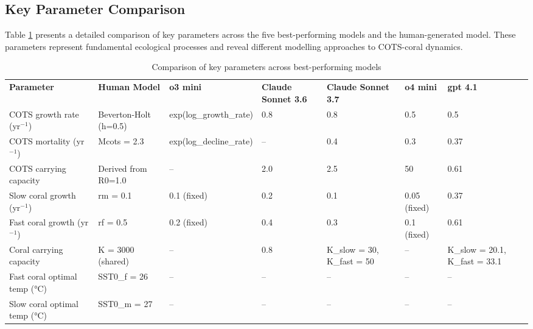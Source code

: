 
\subsection{Key Parameter Comparison}
\label{subsec:parameter_comparison}

Table \ref{tab:parameter_comparison} presents a detailed comparison of key parameters across the five best-performing models and the human-generated model. These parameters represent fundamental ecological processes and reveal different modelling approaches to COTS-coral dynamics.

\begin{landscape}
\begin{table}[H]
\centering
\begin{footnotesize}
\caption{Comparison of key parameters across best-performing models}
\label{tab:parameter_comparison}
\begin{tabular}{p{3.2cm}p{2.8cm}p{2.8cm}p{2.8cm}p{2.8cm}p{2.8cm}p{2.8cm}}
 
\textbf{Parameter} & \textbf{Human Model} & \textbf{o3 mini} & \textbf{Claude Sonnet 3.6} & \textbf{Claude Sonnet 3.7} & \textbf{o4 mini} & \textbf{gpt 4.1} \\
 
COTS growth rate (yr$^{-1}$) & Beverton-Holt (h=0.5) & exp(log\_growth\_rate) & 0.8 & 0.8 & 0.5 & 0.5 \\
 
COTS mortality (yr$^{-1}$) & Mcots = 2.3 & exp(log\_decline\_rate) & -- & 0.4 & 0.3 & 0.37 \\
 
COTS carrying capacity & Derived from R0=1.0 & -- & 2.0 & 2.5 & 50 & 0.61 \\
 
Slow coral growth (yr$^{-1}$) & rm = 0.1 & 0.1 (fixed) & 0.2 & 0.1 & 0.05 (fixed) & 0.37 \\
 
Fast coral growth (yr$^{-1}$) & rf = 0.5 & 0.2 (fixed) & 0.4 & 0.3 & 0.1 (fixed) & 0.61 \\
 
Coral carrying capacity & K = 3000 (shared) & -- & 0.8 & K\_slow = 30, K\_fast = 50 & -- & K\_slow = 20.1, K\_fast = 33.1 \\
 
Fast coral optimal temp (°C) & SST0\_f = 26 & -- & -- & -- & -- & -- \\
 
Slow coral optimal temp (°C) & SST0\_m = 27 & -- & -- & -- & -- & -- \\
 

\end{tabular}
\end{footnotesize}
\end{table}
\end{landscape}

